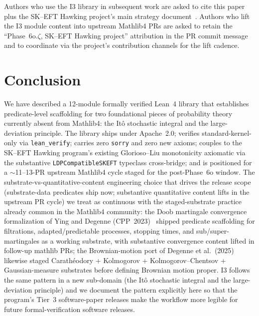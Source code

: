 \documentclass[11pt]{article}
\begin{document}
Authors who use the I3 library in subsequent work are asked to cite
this paper plus the SK--EFT Hawking project's main strategy
document~\cite{Roehm2026Strategy}. Authors who lift the I3 module
content into upstream Mathlib4 PRs are asked to retain the
``Phase~6o.$\zeta$, SK--EFT Hawking project'' attribution in the
PR commit message and to coordinate via the project's contribution
channels for the lift cadence.


\section{Conclusion}
\label{sec:conclusion}

We have described a 12-module formally verified Lean~4 library that
establishes predicate-level scaffolding for two foundational pieces
of probability theory currently absent from Mathlib4: the It\^o
stochastic integral and the large-deviation principle. The library
ships under Apache~2.0; verifies standard-kernel-only via
\texttt{lean\_verify}; carries zero \texttt{sorry} and zero new
axioms; couples to the SK--EFT Hawking program's existing
Glorioso--Liu monotonicity axiomatic via the substantive
\texttt{LDPCompatibleSKEFT} typeclass cross-bridge; and is
positioned for a $\sim$11--13-PR upstream Mathlib4 cycle staged for
the post-Phase~6o window. The substrate-vs-quantitative-content engineering choice that drives
the release scope (substrate-data predicates ship now; substantive
quantitative content lifts in the upstream PR cycle) we treat as
continuous with the staged-substrate practice already common in the
Mathlib4 community: the Doob martingale convergence formalization
of Ying and Degenne (CPP~2023)~\cite{YingDegenne2022Martingales}
shipped predicate scaffolding for filtrations, adapted/predictable
processes, stopping times, and sub/super-martingales as a working
substrate, with substantive convergence content lifted in follow-up
mathlib PRs; the Brownian-motion port of Degenne et al.\
(2025)~\cite{Degenne2025BrownianMotion} likewise staged
Carath\'eodory + Kolmogorov + Kolmogorov--Chentsov + Gaussian-measure
substrates before defining Brownian motion proper. I3 follows the
same pattern in a new sub-domain (the It\^o stochastic integral
and the large-deviation principle) and we document the pattern
explicitly here so that the program's Tier~3 software-paper releases
make the workflow more legible for future formal-verification
software releases.
\end{document}
